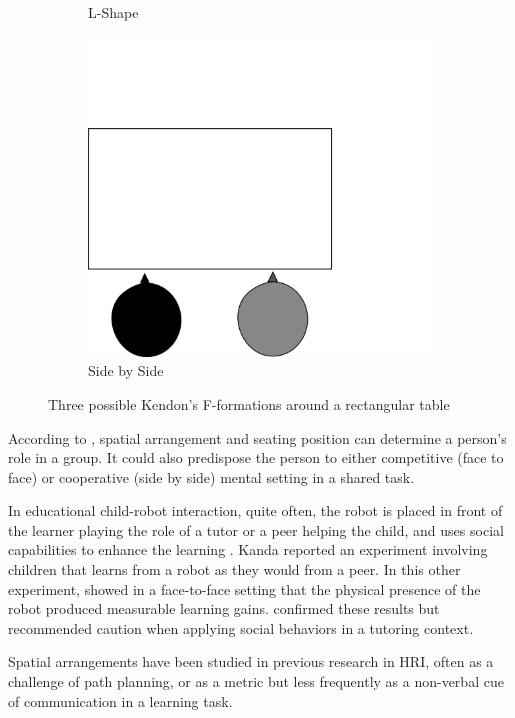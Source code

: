 \documentclass[letterpaper, 10 pt, conference]{ieeeconf}  %
\begin{document}
\begin{figure}[h!]
\begin{subfigure}{0.2\textwidth}
		\caption{L-Shape}
		\label{fig:lshape}
	\end{subfigure}
	\begin{subfigure}{0.2\textwidth}
		\centering
		\includegraphics[width=0.75\linewidth]{./figures/fformationss.png}
		\caption{Side by Side }
		\label{fig:sidebside}
	\end{subfigure}
	\caption{Three possible Kendon's F-formations around a rectangular table}
	\label{fig:fformations}
\end{figure}

According to \cite{knapp2013nonverbal}, spatial arrangement and seating position can determine a person's role in a group.
It could also predispose the person to either competitive (face to face) or cooperative (side by side) mental setting in a shared task.



In educational child-robot interaction, quite often, the robot is placed in front of the learner playing the role of a tutor or a peer helping the child, and uses social capabilities to enhance the learning \cite{Saerbeck2010}.
Kanda \cite{Kanda2004} reported an experiment involving children that learns from a robot as they would from a peer.
In this other experiment,
\cite{Leyzberg2014} showed in a face-to-face setting that the physical presence of the robot produced measurable learning gains.
\cite{Kennedy2015} confirmed these results but recommended caution when applying social behaviors in a tutoring context. 

Spatial arrangements have been studied in previous research\cite{Kuzuoka,huttenrauch2006investigating,vazquez2014spatial} in HRI, often as a challenge of path planning, or as a metric but less frequently as a non-verbal cue of communication in a learning task.
\end{document}
